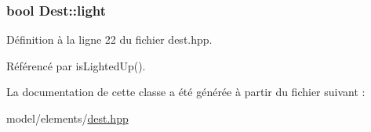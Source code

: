 \subsubsection[{light}]{\setlength{\rightskip}{0pt plus 5cm}bool Dest\+::light\hspace{0.3cm}{\ttfamily [private]}}\label{classDest_abde9aa4bba2ce7868d90fa873761753d}


Définition à la ligne 22 du fichier dest.\+hpp.



Référencé par is\+Lighted\+Up().



La documentation de cette classe a été générée à partir du fichier suivant \+:\begin{DoxyCompactItemize}
\item 
model/elements/\hyperlink{dest_8hpp}{dest.\+hpp}\end{DoxyCompactItemize}
